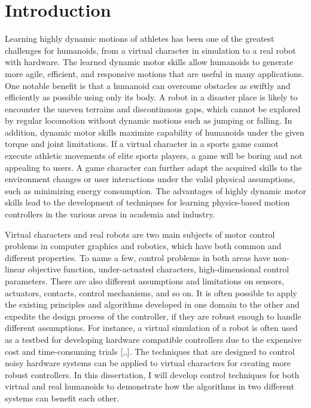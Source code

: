 \chapter{Introduction}
 
Learning highly dynamic motions of athletes has been one of the greatest
challenges for humanoids, from a virtual character in simulation to a real
robot with hardware.
The learned dynamic motor skills allow humanoids to generate more agile,
efficient, and responsive motions that are useful in many applications.
One notable benefit is that a humanoid can overcome obstacles as swiftly and
efficiently as possible using only its body.
A robot in a disaster place is likely to encounter the uneven
terrains and discontinuous gaps, which cannot be explored by regular
locomotion without dynamic motions such as jumping or falling.
In addition, dynamic motor skills maximize capability of humanoids
under the given torque and joint limitations.
If a virtual character in a sports game cannot execute athletic movements
of elite sports players, a game will be boring and not appealing to users.
A game character can further adapt the acquired skills to the
environment changes or user interactions under the valid physical assumptions,
such as minimizing energy consumption.
The advantages of highly dynamic motor skills lead to the
development of techniques for learning physics-based motion controllers
in the various areas in academia and industry.


Virtual characters and real robots are two main subjects of motor control
problems in computer graphics and robotics, which have both common and
different properties.
To name a few, control problems in both areas have non-linear
objective function, under-actuated characters, high-dimensional
control parameters.
There are also different assumptions and limitations
on sensors, actuators, contacts, control mechanisms, and so on.
It is often possible to apply the existing principles and
algorithms developed in one domain to the other and expedite the
design process of the controller, 
if they are robust enough to handle different assumptions.
For instance, a virtual simulation of a robot is often used as a testbed for
developing hardware compatible controllers due to the expensive cost and
time-consuming trials [,,].
The techniques that are designed to control noisy hardware systems 
can be applied to virtual characters for creating more robust controllers.
In this dissertation, I will develop control techniques for both virtual and
real humanoids to demonstrate how the algorithms in two different systems can
benefit each other.

